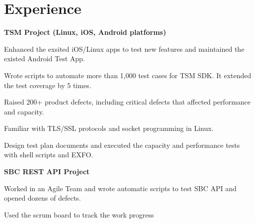 \documentclass[a4paper]{lyu-resume} %
\begin{document}




%
%

\begin{minipage}[t]{0.66\textwidth} %
\section{Experience}
\textbf{TSM Project (Linux, iOS, Android platforms)}
\vspace{\topsep} %
\begin{tightitemize}
\item Enhanced the exsited iOS/Linux apps to test new features and maintained the existed Android Test App.
\item Wrote scripts to automate more than 1,000 test cases for TSM SDK. It extended the test coverage by 5 times. 
\item Raised 200+ product defects, including critical defects that affected performance and capacity.
\item Familiar with TLS/SSL protocols and socket programming in Linux.
\item Design test plan documents and executed the capacity and performance tests with shell scripts and EXFO.
\end{tightitemize}

\vspace{\topsep} %
\textbf{SBC REST API Project}
\begin{tightitemize}
\item Worked in an Agile Team and wrote automatic scripts to test SBC API and opened dozens of defects.
\item Used the scrum board to track the work progress
\end{tightitemize}


\end{minipage}
\end{document}
